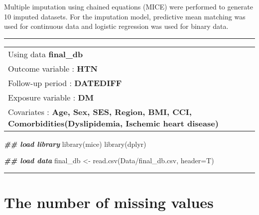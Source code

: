 \documentclass[
]{book}
\newenvironment{Shaded}{\begin{snugshade}}{\end{snugshade}}
\newcommand{\AttributeTok}[1]{\textcolor[rgb]{0.77,0.63,0.00}{#1}}
\newcommand{\DocumentationTok}[1]{\textcolor[rgb]{0.56,0.35,0.01}{\textbf{\textit{#1}}}}
\newcommand{\FunctionTok}[1]{\textcolor[rgb]{0.00,0.00,0.00}{#1}}
\newcommand{\NormalTok}[1]{#1}
\newcommand{\OtherTok}[1]{\textcolor[rgb]{0.56,0.35,0.01}{#1}}
\newcommand{\StringTok}[1]{\textcolor[rgb]{0.31,0.60,0.02}{#1}}
\begin{document}
Multiple imputation using chained equations (MICE) were performed to generate 10 imputed datasets. For the imputation model, predictive mean matching was used for continuous data and logistic regression was used for binary data.

\begin{center}\rule{0.5\linewidth}{0.5pt}\end{center}

\begin{longtable}[]{@{}l@{}}
\toprule()
\endhead
Using data \textbf{final\_db} \\
Outcome variable : \textbf{HTN} \\
Follow-up period : \textbf{DATEDIFF} \\
Exposure variable : \textbf{DM} \\
Covariates : \textbf{Age, Sex, SES, Region, BMI, CCI, Comorbidities(Dyslipidemia, Ischemic heart disease)} \\
\bottomrule()
\end{longtable}

\begin{Shaded}
\begin{Highlighting}[]
\DocumentationTok{\#\# load library}
\FunctionTok{library}\NormalTok{(mice)}
\FunctionTok{library}\NormalTok{(dplyr)}
\end{Highlighting}
\end{Shaded}

\begin{Shaded}
\begin{Highlighting}[]
\DocumentationTok{\#\# load data}
\NormalTok{final\_db }\OtherTok{\textless{}{-}} \FunctionTok{read.csv}\NormalTok{(}\StringTok{\textquotesingle{}Data/final\_db.csv\textquotesingle{}}\NormalTok{, }\AttributeTok{header=}\NormalTok{T)}
\end{Highlighting}
\end{Shaded}

\begin{center}\rule{0.5\linewidth}{0.5pt}\end{center}

\hypertarget{the-number-of-missing-values}{%
\section{The number of missing values}\label{the-number-of-missing-values}}
\end{document}
